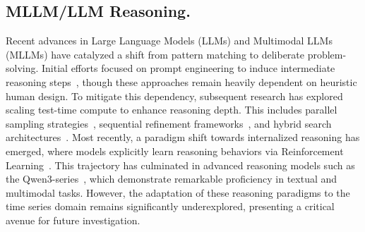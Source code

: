 \documentclass{article}
\theoremstyle{plain}
\theoremstyle{definition}
\theoremstyle{remark}
\theoremstyle{plain}
\begin{document}
\subsection{MLLM/LLM Reasoning.} 
Recent advances in Large Language Models (LLMs) and Multimodal LLMs (MLLMs) have catalyzed a shift from pattern matching to deliberate problem-solving. Initial efforts focused on prompt engineering to induce intermediate reasoning steps~\citep{wei2022chain, khot2022decomposed, zhou2022least, zheng2023ddcot, zhang2023multimodal, gao2024cantor, ho2025arcmemo, chen2025pandora, liang2025rover}, though these approaches remain heavily dependent on heuristic human design. To mitigate this dependency, subsequent research has explored scaling test-time compute to enhance reasoning depth. This includes parallel sampling strategies~\citep{brown2024large, snell2024scaling, karan2025reasoning, wang2022self, aggarwal2023let}, sequential refinement frameworks~\citep{yao2022react, yang2023mm, gou2023critic, zhang2024small, zhang2023cumulative}, and hybrid search architectures~\citep{yao2023tree, besta2024graph, hao2023reasoning, ding2024everything}. Most recently, a paradigm shift towards internalized reasoning has emerged, where models explicitly learn reasoning behaviors via Reinforcement Learning~\citep{guo2025deepseek, yu2024flow, xie2025logic, zhou2025r1, huang2025vision, yu2026arrowgev}. This trajectory has culminated in advanced reasoning models such as the Qwen3-series~\citep{yang2025qwen3}, which demonstrate remarkable proficiency in textual and multimodal tasks. However, the adaptation of these reasoning paradigms to the time series domain remains significantly underexplored, presenting a critical avenue for future investigation.
\end{document}
